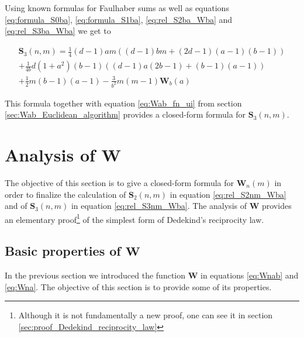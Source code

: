 \documentclass{article}%
\newcommand{\SUMS}[3]{\mathbf{S}_{#1}\left(#2,#3\right)}
\newcommand{\SUMW}[2]{\mathbf{W}_{#1}\left(#2\right)}
\begin{document}
Using known formulas for Faulhaber sums as well as equations \ref{eq:formula_S0ba}, \ref{eq:formula_S1ba}, \ref{eq:rel_S2ba_Wba} and \ref{eq:rel_S3ba_Wba} we get to

\begin{multline}\label{eq:rel_S3nm_Wba}
\SUMS{3}{n}{m} = \frac{1}{4}(d-1)am\left((d-1)bm+(2d-1)(a-1)(b-1)\right)\\
+\frac{1}{4b}d(1+a^2)(b-1)\left((d-1)a(2b-1)+(b-1)(a-1)\right)\\
+\frac{1}{2}m(b-1)(a-1)-\frac{3}{b^2}m(m-1)\SUMW{b}{a}
\end{multline}

This formula together with equation \ref{eq:Wab_fn_ui} from section \ref{sec:Wab_Euclidean_algorithm} provides a closed-form formula for $\SUMS{3}{n}{m}$.

\section{Analysis of $\mathbf{W}$}

The objective of this section is to give a closed-form formula for $\SUMW{n}{m}$ in order to finalize the calculation of $\SUMS{2}{n}{m}$ in equation \ref{eq:rel_S2nm_Wba} and of $\SUMS{3}{n}{m}$ in equation \ref{eq:rel_S3nm_Wba}. The analysis of $\mathbf{W}$ provides an elementary proof\footnote{Although it is not fundamentally a new proof, one can see it in section \ref{sec:proof_Dedekind_reciprocity_law}} of the simplest form of Dedekind's reciprocity law.

\subsection{Basic properties of $\mathbf{W}$}

In the previous section we introduced the function $\mathbf{W}$ in equations \ref{eq:Wnab} and \ref{eq:Wna}. The objective of this section is to provide some of its properties. 
\end{document}

